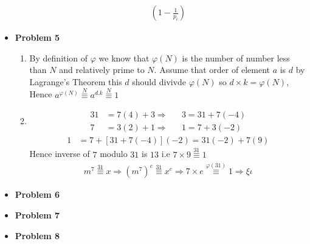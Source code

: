 \documentclass{article}
\begin{document}
\begin{itemize}
\begin{enumerate}[label=(\alph*)]
\begin{align*}
					{\left(1-\frac{1}{p_i}\right)}
				\end{align*}
		\end{enumerate}
	\item{\textcolor{for}{\textbf{Problem 5}}}
		\begin{enumerate}[label=(\alph*)]
		\item
			By definition of $\varphi$ we know that $\varphi(N)$ is the number of number less than $N$ and relatively prime to $N$.	
			Assume that order of element $a$ is $d$ by Lagrange's Theorem this $d$ should divivde $\varphi(N)$ so 
			$d \times k = \varphi(N)$, Hence $a^{\varphi(N)} \stackrel{N}{\equiv} a^{d. k} \stackrel{N}{\equiv}1$
		\item
			\begin{align*}
				31 &= 7(4) + 3 \Rightarrow && 3=31 + 7(-4) \\ 
				7 &= 3(2) + 1 \Rightarrow && 1=7  + 3(-2)
			\end{align*}
			\begin{align*}
				1 &= 7 + \left[ 31 + 7(-4) \right] (-2) = 31(-2) + 7(9)
			\end{align*}
			Hence inverse of $7$ modulo $31$ is $13$ i.e $7 \times 9\stackrel{31}{\equiv}1$\\
			\begin{align*}
				m^7 \stackrel{31}{\equiv} x \Rightarrow \left(m^{7}\right)^{e} \stackrel{31}{\equiv} x^{e} \Rightarrow
				7 \times e \stackrel{\varphi(31)}{\equiv}1 \Rightarrow 
				\xi \iota
			\end{align*}
		\end{enumerate}

	\item{\textcolor{for}{\textbf{Problem 6}}}
	\item{\textcolor{for}{\textbf{Problem 7}}}
	\item{\textcolor{for}{\textbf{Problem 8}}}
\end{itemize}
\end{document}
